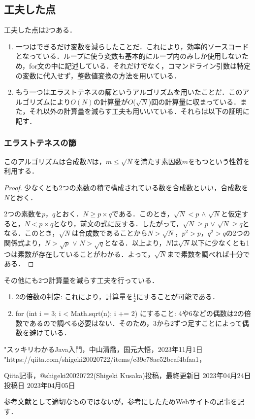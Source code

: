 \documentclass{jlreq}
\begin{document}
  \newpage

  \subsection*{工夫した点}
  工夫した点は2つある．
  \begin{enumerate}[(1.) ]
    \item 一つはできるだけ変数を減らしたことだ．これにより，効率的ソースコードとなっている．ループに使う変数も基本的にループ内のみしか使用しないため，for文の中に記述している．それだけでなく，コマンドライン引数は特定の変数に代入せず，整数値変換の方法を用いている．
    \item もう一つはエラストテネスの篩というアルゴリズムを用いたことだ．このアルゴリズムにより$O(N)$の計算量が$O$($\sqrt{N}$)回の計算量に収まっている．また，それ以外の計算量を減らす工夫も用いいている．それらは以下の証明に記す．
  \end{enumerate}

  \subsubsection*{エラストテネスの篩}
  このアルゴリズムは合成数$N$は，$m \le \sqrt{N}$を満たす素因数$m$をもつという性質を利用する．

  \begin{proof}
    少なくとも2つの素数の積で構成されている数を合成数といい，合成数を$N$とおく．

    2つの素数を$p$，$q$とおく．$N \ge p \times q$である．このとき，$\sqrt{N} < p$  $\land$  $\sqrt{N}$と仮定すると，$N < p \times q$となり，前文の式に反する．したがって，$\sqrt{N} \ge p$ $\lor$ $\sqrt{N} \ge q$となる．このとき，$\sqrt{N}$は合成数であることから$N > \sqrt{N}$，$p^2 > p$，$q^2 > q$の2つの関係式より，$N > \sqrt{p}$ $\lor$ $N > \sqrt{q}$となる．以上より，$N$は$\sqrt{N}$以下に少なくとも1つは素数が存在していることがわかる．よって，$\sqrt{N}$まで素数を調べれば十分である．
  \end{proof}

  その他にも2つ計算量を減らす工夫を行っている．
  \begin{enumerate}[・ ]
    \item 2の倍数の判定: これにより，計算量を$\frac{1}{2}$にすることが可能である．
    \item for (int i = 3; i < Math.sqrt(n); i += 2) にすること: 4や6などの偶数は2の倍数であるので調べる必要はない．そのため，3から2ずつ足すことによって偶数を避けている．
  \end{enumerate}

  \begin{thebibliography}{99}
    \bibitem "スッキリわかるJava入門，中山清喬，国元大悟，2023年11月1日
    \bibitem "https://qiita.com/shigeki20020722/items/c39e78ae52bcaf4bfaa1，
    
    Qiita記事，@shigeki20020722(Shigeki Kusaka)投稿，最終更新日 2023年04月24日投稿日 2023年04月05日
  \end{thebibliography}

  参考文献として適切なものではないが，参考にしたためWebサイトの記事を記す．
\end{document}
